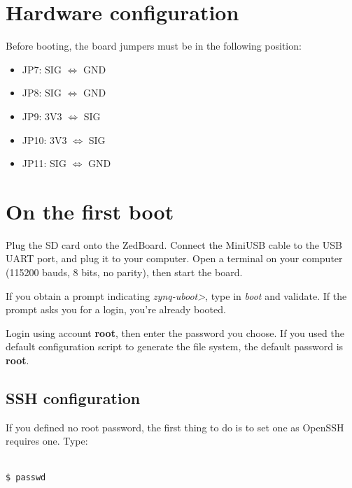 \documentclass[openany,a4paper]{book}
\begin{document}
\section{Hardware configuration}

Before booting, the board jumpers must be in the following position:

\begin{itemize}
  \item JP7: SIG $\Leftrightarrow$ GND
  \item JP8: SIG $\Leftrightarrow$ GND
  \item JP9: 3V3 $\Leftrightarrow$ SIG
  \item JP10: 3V3 $\Leftrightarrow$ SIG
  \item JP11: SIG $\Leftrightarrow$ GND
\end{itemize}

\section{On the first boot}\label{section_first_boot}

Plug the SD card onto the ZedBoard.
Connect the MiniUSB cable to the USB UART port, and plug it to your computer.
Open a terminal on your computer (115200 bauds, 8 bits, no parity), then start the board.

If you obtain a prompt indicating \textit{zynq-uboot>}, type in \textit{boot} and validate.
If the prompt asks you for a login, you're already booted.

Login using account \textbf{root}, then enter the password you choose.
If you used the default configuration script to generate the file system, the default password is \textbf{root}.

\subsection{SSH configuration}

If you defined no root password, the first thing to do is to set one as OpenSSH requires one.
Type:

\begin{tabbing}
\kill \hspace{1cm} \= \\
\> \texttt{\$ passwd} \\
\end{tabbing}
\end{document}
